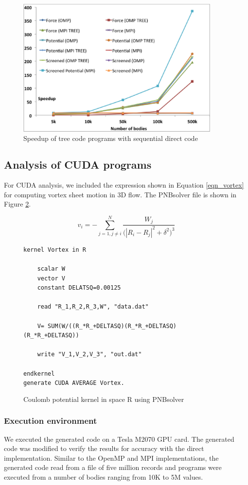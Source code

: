 \documentclass[draftclsnofoot]{elsarticle}
\begin{document}
\begin{figure}[!t]
\centering
\includegraphics[width=4.0in]{ompmpi2.eps}
\caption{Speedup of tree code programs with sequential direct code}
\label{fig_ompmpi2}
\end{figure}

\subsection{Analysis of CUDA programs}
\label{sec_cuda}

For CUDA analysis, we included the expression  shown in Equation  \ref{eqn_vortex} \cite{vortex} for computing vortex sheet motion in 3D flow. The PNBsolver file
is shown in Figure \ref{fig_vortex}. 

\begin{equation}
\label{eqn_vortex}
v_i= -\sum \limits_{j=1, j\ne i}^{N} \frac{W_j}{{({|R_i- R_j|}^2+{\delta}^2})^3} 
\end{equation}
\begin{figure}[!t]
\centering
\begin{lstlisting}[style=AMMA, language=PNB]
kernel Vortex in R

	scalar W
	vector V
	constant DELATSQ=0.00125	

	read "R_1,R_2,R_3,W", "data.dat"

	V= SUM(W/((R_*R_+DELTASQ)(R_*R_+DELTASQ) (R_*R_+DELTASQ))

	write "V_1,V_2,V_3", "out.dat"
	
endkernel
generate CUDA AVERAGE Vortex. 
\end{lstlisting}
\caption{Coulomb potential kernel in space R using PNBsolver}
\label{fig_vortex}
\end{figure}

\subsubsection{Execution environment}
We executed the generated code on a Tesla M2070 GPU card. The generated code was modified to verify the results for accuracy with the direct implementation. Similar
to the OpenMP and MPI implementations, the generated code read from a file of five million records and programs were executed from a number of bodies ranging from 10K to
5M values. 
\end{document}
